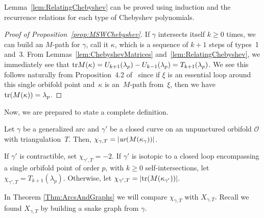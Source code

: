 \documentclass[pdftex]{sigma}%
\numberwithin{equation}{section}
\begin{document}
Lemma~\ref{lem:RelatingChebyshev} can be proved using induction and the recurrence relations for each type of Chebyshev polynomials.

\begin{proof}[Proof of Proposition~\ref{prop:MSWChebyshev}]
If $\gamma$ intersects itself $k \geq 0$ times, we can build an $M$-path for $\gamma$, call it $\kappa$, which is a sequence of $k+1$ steps of types~1 and~3. From Lemmas~\ref{lem:ChebyshevMatrices} and~\ref{lem:RelatingChebyshev}, we immediately see that ${\rm tr}M(\kappa) = U_{k+1}(\lambda_p) - U_{k-1}(\lambda_p) = T_{k+1}(\lambda_p)$. We see this follows naturally from Proposition~4.2 of~\cite{MSW-bases} since if $\xi$ is an essential loop around this single orbifold point and~$\kappa$ is an~$M$-path from~$\xi$, then we have ${\rm tr}(M(\kappa)) = \lambda_p$.
\end{proof}

Now, we are prepared to state a complete definition.

\begin{Definition}\label{def:chi_gamma}
Let $\gamma$ be a generalized arc and $\gamma'$ be a closed curve on an unpunctured orbifold $\mathcal{O}$ with triangulation~$T$. Then, $\chi_{\gamma,T} = \vert \emph{ur} (M(\kappa_\gamma)) \vert$.

If $\gamma'$ is contractible, set $\chi_{\gamma',T} = -2$. If $\gamma'$ is isotopic to a closed loop encompassing a single orbifold point of order $p$, with $k \geq 0$ self-intersections, let $\chi_{\gamma',T} = T_{k+1}(\lambda_p)$. Otherwise, let $\chi_{\gamma',T} = \vert {\rm tr} (M(\kappa_{\gamma'})) \vert$.
\end{Definition}

In Theorem \ref{Thm:ArcsAndGraphs} we will compare $\chi_{\gamma,T}$ with $X_{\gamma,T}$. Recall we found $X_{\gamma,T}$ by building a snake graph from $\gamma$.
\end{document}
